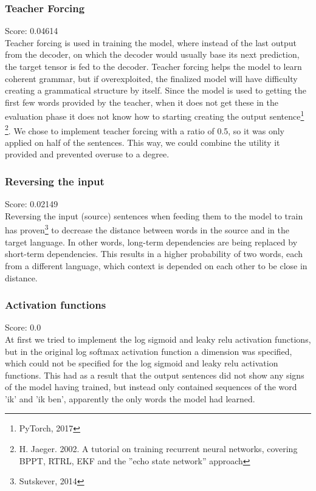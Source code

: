 \documentclass[11pt]{article}
\begin{document}
\subsubsection*{Teacher Forcing}
Score: 0.04614
\\Teacher forcing is used in training the model, where instead of the last output from the decoder, on which the decoder would usually base its next prediction, the target tensor is fed to the decoder. Teacher forcing helps the model to learn coherent grammar, but if overexploited, the finalized model will have difficulty creating a grammatical structure by itself. Since the model is used to getting the first few words provided by the teacher, when it does not get these in the evaluation phase it does not know how to starting creating the output sentence\footnote[8]{PyTorch, 2017} \footnote[9]{ H. Jaeger. 2002. A tutorial on training recurrent neural networks, covering BPPT, RTRL, EKF and the ”echo state network” approach}. We chose to implement teacher forcing with a ratio of 0.5, so it was only applied on half of the sentences. This way, we could combine the utility it provided and prevented overuse to a degree.

\subsubsection*{Reversing the input}
Score: 0.02149
\\Reversing the input (source) sentences when feeding them to the model to train has proven\footnote[10]{Sutskever, 2014} to decrease the distance between words in the source and in the target language. In other words, long-term dependencies are being replaced by short-term dependencies. This results in a higher probability of two words, each from a different language, which context is depended on each other to be close in distance.

\subsubsection*{Activation functions}
Score: 0.0
\\At first we tried to implement the log sigmoid and leaky relu activation functions, but in the original log softmax activation function a dimension was specified, which could not be specified for the log sigmoid and leaky relu activation functions. This had as a result that the output sentences did not show any signs of the model having trained, but instead only contained sequences of the word 'ik' and 'ik ben', apparently the only words the model had learned.
\end{document}

